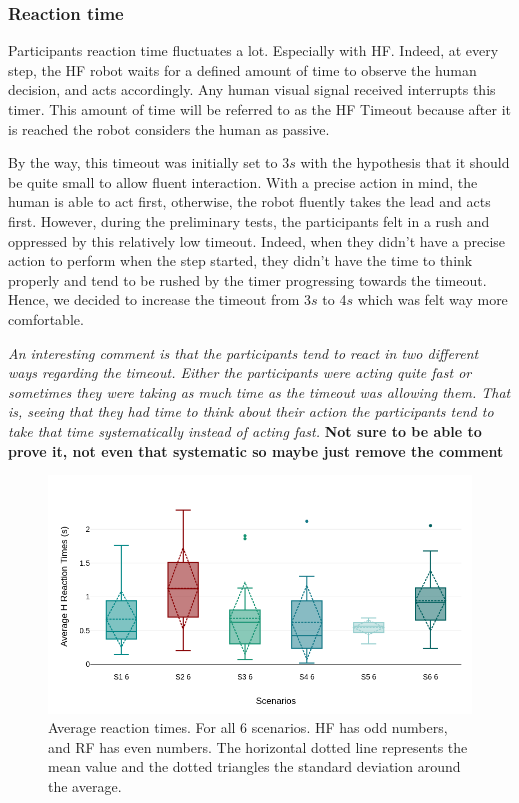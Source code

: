 \subsubsection*{Reaction time}
Participants reaction time fluctuates a lot. Especially with HF. Indeed, at every step, the HF robot waits for a defined amount of time to observe the human decision, and acts accordingly. Any human visual signal received interrupts this timer. This amount of time will be referred to as the HF Timeout because after it is reached the robot considers the human as passive.

By the way, this timeout was initially set to 3$s$ with the hypothesis that it should be quite small to allow fluent interaction. With a precise action in mind, the human is able to act first, otherwise, the robot fluently takes the lead and acts first. However, during the preliminary tests, the participants felt in a rush and oppressed by this relatively low timeout. Indeed, when they didn't have a precise action to perform when the step started, they didn't have the time to think properly and tend to be rushed by the timer progressing towards the timeout. Hence, we decided to increase the timeout from 3$s$ to 4$s$ which was felt way more comfortable. 

\textit{An interesting comment is that the participants tend to react in two different ways regarding the timeout. Either the participants were acting quite fast or sometimes they were taking as much time as the timeout was allowing them. That is, seeing that they had time to think about their action the participants tend to take that time systematically instead of acting fast.} \textbf{Not sure to be able to prove it, not even that systematic so maybe just remove the comment}

\begin{figure}
    \centering
    \includegraphics[width=\linewidth]{images/Chapter5/av_reaction_times.png}
    \caption{Average reaction times. For all 6 scenarios. HF has odd numbers, and RF has even numbers. The horizontal dotted line represents the mean value and the dotted triangles the standard deviation around the average.}
    \label{fig:h_reaction_time}
\end{figure}

